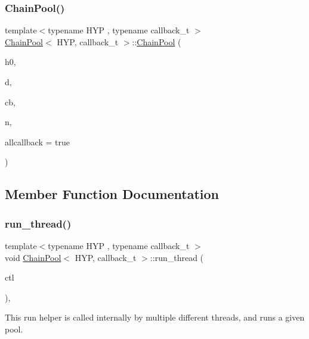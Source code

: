 \subsubsection{\texorpdfstring{Chain\+Pool()}{ChainPool()}\hspace{0.1cm}{\footnotesize\ttfamily [2/2]}}
{\footnotesize\ttfamily template$<$typename H\+YP , typename callback\+\_\+t $>$ \\
\hyperlink{class_chain_pool}{Chain\+Pool}$<$ H\+YP, callback\+\_\+t $>$\+::\hyperlink{class_chain_pool}{Chain\+Pool} (\begin{DoxyParamCaption}\item[{H\+YP \&}]{h0,  }\item[{typename H\+Y\+P\+::data\+\_\+t $\ast$}]{d,  }\item[{callback\+\_\+t \&}]{cb,  }\item[{size\+\_\+t}]{n,  }\item[{bool}]{allcallback = {\ttfamily true} }\end{DoxyParamCaption})\hspace{0.3cm}{\ttfamily [inline]}}



\subsection{Member Function Documentation}
\mbox{\label{class_chain_pool_a0943aa34e6c0931611d552e686fbcb4b}} 
\subsubsection{\texorpdfstring{run\+\_\+thread()}{run\_thread()}}
{\footnotesize\ttfamily template$<$typename H\+YP , typename callback\+\_\+t $>$ \\
void \hyperlink{class_chain_pool}{Chain\+Pool}$<$ H\+YP, callback\+\_\+t $>$\+::run\+\_\+thread (\begin{DoxyParamCaption}\item[{\hyperlink{struct_control}{Control}}]{ctl }\end{DoxyParamCaption})\hspace{0.3cm}{\ttfamily [inline]}, {\ttfamily [override]}}



This run helper is called internally by multiple different threads, and runs a given pool. 


